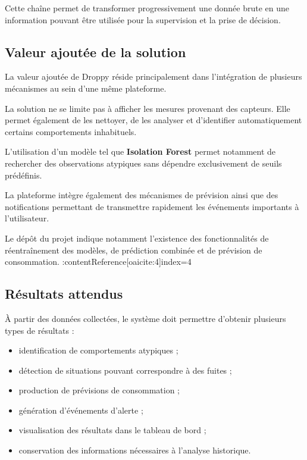 Cette chaîne permet de transformer progressivement une donnée brute en une
information pouvant être utilisée pour la supervision et la prise de
décision.

\subsection{Valeur ajoutée de la solution}

La valeur ajoutée de Droppy réside principalement dans l'intégration de
plusieurs mécanismes au sein d'une même plateforme.

La solution ne se limite pas à afficher les mesures provenant des capteurs.
Elle permet également de les nettoyer, de les analyser et d'identifier
automatiquement certains comportements inhabituels.

L'utilisation d'un modèle tel que \textbf{Isolation Forest} permet notamment
de rechercher des observations atypiques sans dépendre exclusivement de
seuils prédéfinis.

La plateforme intègre également des mécanismes de prévision ainsi que des
notifications permettant de transmettre rapidement les événements
importants à l'utilisateur.

Le dépôt du projet indique notamment l'existence des fonctionnalités de
réentraînement des modèles, de prédiction combinée et de prévision de
consommation. :contentReference[oaicite:4]{index=4}

\subsection{Résultats attendus}

À partir des données collectées, le système doit permettre d'obtenir
plusieurs types de résultats :

\begin{itemize}

    \item identification de comportements atypiques ;

    \item détection de situations pouvant correspondre à des fuites ;

    \item production de prévisions de consommation ;

    \item génération d'événements d'alerte ;

    \item visualisation des résultats dans le tableau de bord ;

    \item conservation des informations nécessaires à l'analyse historique.

\end{itemize}


